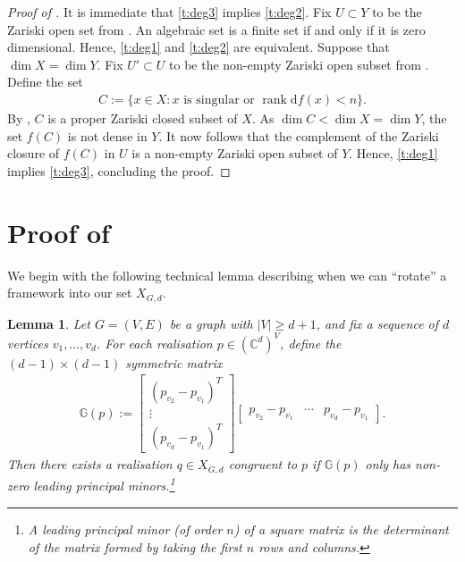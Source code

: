 \documentclass[11pt]{article}
\newtheorem{lemma}[theo]{Lemma}
\theoremstyle{definition}
\numberwithin{equation}{section}
\DeclareMathOperator{\rank}{rank}
\newcommand{\diff}{\mathrm{d}}
\begin{document}
\begin{proof}[Proof of ]
	It is immediate that \ref{t:deg3} implies \ref{t:deg2}.
	Fix $U \subset Y$ to be the Zariski open set from .
	An algebraic set is a finite set if and only if it is zero dimensional.
	Hence, \ref{t:deg1} and \ref{t:deg2} are equivalent.
	Suppose that $\dim X=\dim Y$.
	Fix $U' \subset U$ to be the non-empty Zariski open subset from .
	Define the set
	\begin{align*}
		C := \{x \in X : x \text{ is singular or } \rank \diff f(x) <n\}.
	\end{align*}
	By ,
	$C$ is a proper Zariski closed subset of $X$.
	As $\dim C < \dim X = \dim Y$,
	the set $f(C)$ is not dense in $Y$.
	It now follows that the complement of the Zariski closure of $f(C)$ in $U$ is a non-empty Zariski open subset of $Y$.
	Hence, \ref{t:deg1} implies \ref{t:deg3},
	concluding the proof.
\end{proof}







\section{Proof of \texorpdfstring{}{Lemma}}
\label{sec:xgd}

We begin with the following technical lemma describing when we can ``rotate'' a framework into our set $X_{G,d}$.

\begin{lemma}\label{l:rotate}
	Let $G=(V,E)$ be a graph with $|V| \geq d+1$,
	and fix a sequence of $d$ vertices $v_1,\ldots, v_d$.
	For each realisation $p \in (\mathbb{C}^d)^V$,
	define the $(d-1) \times (d-1)$ symmetric matrix
	\begin{align*}
		\mathbb{G}(p) := 		
		\begin{bmatrix}
			(p_{v_2} - p_{v_1})^T \\
			\vdots \\
			(p_{v_d} - p_{v_1})^T
		\end{bmatrix}
		\begin{bmatrix}
			p_{v_2} - p_{v_1} & \cdots & p_{v_d} - p_{v_1}
		\end{bmatrix}.
	\end{align*}
	Then there exists a realisation $q \in X_{G,d}$ congruent to $p$ if $\mathbb{G}(p)$ only has non-zero leading principal minors.\footnote{A \emph{leading principal minor (of order $n$)} of a square matrix is the determinant of the matrix formed by taking the first $n$ rows and columns.}
\end{lemma}
\end{document}

